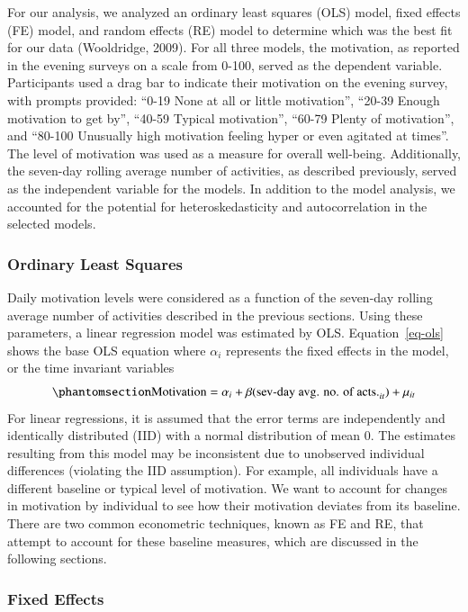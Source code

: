 \documentclass[
  letterpaper,
  number,
  review,
  3p]{elsarticle}
\begin{document}
For our analysis, we analyzed an ordinary least squares (OLS) model,
fixed effects (FE) model, and random effects (RE) model to determine
which was the best fit for our data (Wooldridge, 2009). For all three
models, the motivation, as reported in the evening surveys on a scale
from 0-100, served as the dependent variable. Participants used a drag
bar to indicate their motivation on the evening survey, with prompts
provided: ``0-19 None at all or little motivation'', ``20-39 Enough
motivation to get by'', ``40-59 Typical motivation'', ``60-79 Plenty of
motivation'', and ``80-100 Unusually high motivation feeling hyper or
even agitated at times''. The level of motivation was used as a measure
for overall well-being. Additionally, the seven-day rolling average
number of activities, as described previously, served as the independent
variable for the models. In addition to the model analysis, we accounted
for the potential for heteroskedasticity and autocorrelation in the
selected models.

\subsubsection{Ordinary Least Squares}\label{ordinary-least-squares}

Daily motivation levels were considered as a function of the seven-day
rolling average number of activities described in the previous sections.
Using these parameters, a linear regression model was estimated by OLS.
Equation~\ref{eq-ols} shows the base OLS equation where \(\alpha_{i}\)
represents the fixed effects in the model, or the time invariant
variables \begin{equation}\phantomsection\label{eq-ols}{
\text{Motivation} = \alpha_{i} + \beta (\text{sev-day avg. no. of acts.}_{it}) + \mu_{it}
}\end{equation} For linear regressions, it is assumed that the error
terms are independently and identically distributed (IID) with a normal
distribution of mean 0. The estimates resulting from this model may be
inconsistent due to unobserved individual differences (violating the IID
assumption). For example, all individuals have a different baseline or
typical level of motivation. We want to account for changes in
motivation by individual to see how their motivation deviates from its
baseline. There are two common econometric techniques, known as FE and
RE, that attempt to account for these baseline measures, which are
discussed in the following sections.

\subsubsection{Fixed Effects}\label{fixed-effects}
\end{document}
